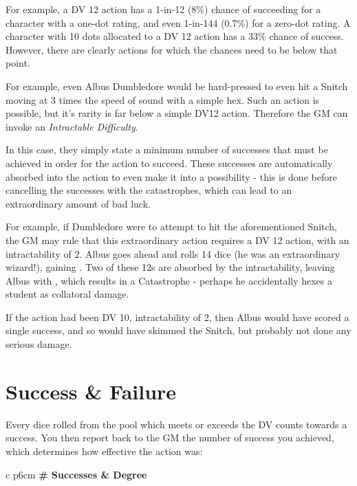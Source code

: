 For example, a DV 12 action has a 1-in-12 (8\%) chance of succeeding for a character with a one-dot rating, and even 1-in-144 (0.7\%) for a zero-dot rating. A character with 10 dots allocated to a DV 12 action has a 33\% chance of success. However, there are clearly actions for which the chances need to be below that point. 

For example, even Albus Dumbledore would be hard-pressed to even hit a Snitch moving at 3 times the speed of sound with a simple hex. Such an action is possible, but it's rarity is far below a simple DV12 action. Therefore the GM can invoke an {\it Intractable Difficulty}. 

In this case, they simply state a minimum number of successes that must be achieved in order for the action to succeed. These successes are automatically absorbed into the action to even make it into a possibility - this is done before cancelling the successes with the catastrophes, which can lead to an extraordinary amount of bad luck. 

For example, if Dumbledore were to attempt to hit the aforementioned Snitch, the GM may rule that this extraordinary action requires a DV 12 action, with an intractability of 2. Albus goes ahead and rolls 14 dice (he was an extraordinary wizard!), gaining . Two of these 12s are absorbed by the intractability, leaving Albus with , which results in a Catastrophe - perhaps he accidentally hexes a student as collatoral damage. 

If the action had been DV 10, intractability of 2, then Albus would have scored a single success, and so would have skimmed the Snitch, but probably not done any serious damage. 

\section{Success \& Failure}

Every dice rolled from the pool which meets or exceeds the DV counts towards a success. You then report back to the GM the number of success you achieved, which determines how effective the action was:


\begin{center}
	\begin{rndtable}{c p{6cm}}
		\bf \# Successes & \bf Degree \\
	\end{rndtable}
\end{center}

